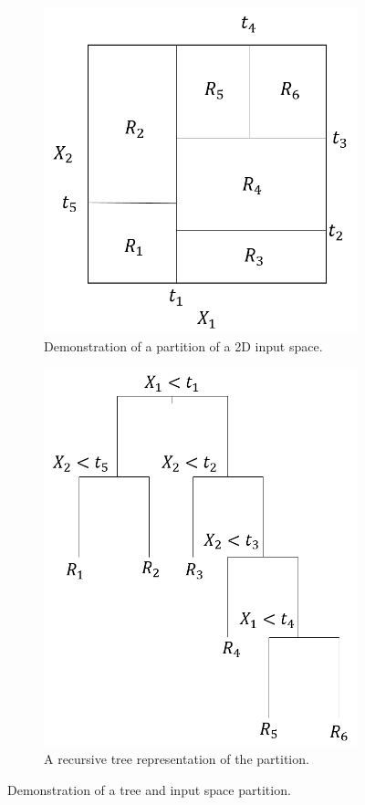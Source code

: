\begin{refsection}
\begin{figure}[H]
\centering	
\begin{subfigure}[b]{0.42\textwidth}
	\centering
\includegraphics[width=0.7\linewidth]{../figures/statisticalLearning/treeMethods/2DInputSpacePartitionDemo}
\caption{Demonstration of a partition of a 2D input space.}
\end{subfigure}\quad
\begin{subfigure}[b]{0.42\textwidth}
	\centering
\includegraphics[width=0.7\linewidth]{../figures/statisticalLearning/treeMethods/2DInputSpacePartitionRecursiveTreeDemo}
\caption{A recursive tree representation of the partition.}
\label{fig:2DInputSpacePartitionRecursiveTreeDemo}
\end{subfigure}
\caption{Demonstration of a tree and input space partition.}
\end{figure}




\end{refsection}

